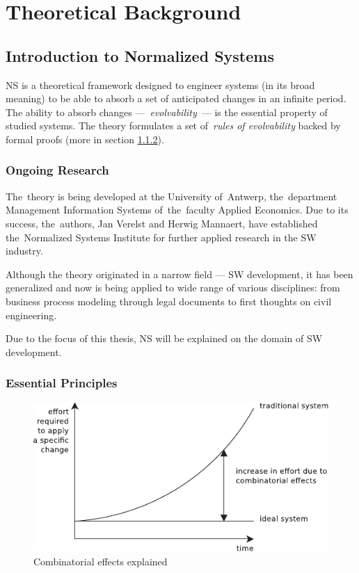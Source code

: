 \documentclass[thesis=M,english,hidelinks]{FITthesis}[2012/10/20]
\begin{document}
% 
% 
\chapter{Theoretical Background}
\label{sec:theoretical_background}

% 
% 
\section{Introduction to Normalized Systems}
\acrfull{NS} is a theoretical framework designed to engineer systems (in its broad meaning) to be able to absorb a set of anticipated changes in an infinite period. The ability to absorb changes ---~\textit{evolvability}~--- is the essential property of studied systems. The theory formulates a set of~\textit{rules of evolvability} backed by formal proofs (more in section \ref{sec:evolvability_rules}).

\subsection{Ongoing Research}
The~theory is being developed at the University of~Antwerp, the~department Management Information Systems of~the~faculty Applied Economics. Due to its success, the~authors, Jan Verelst and Herwig Mannaert, have established the~Normalized Systems Institute for further applied research in the \acrshort{SW} industry.

Although the theory originated in a narrow field --- \acrlong{SW} development, it has been generalized and now is being applied to wide range of various disciplines: from business process modeling through legal documents to first thoughts on civil engineering.~\cite{ns-towards-evolvable}

Due to the focus of this thesis, \acrlong{NS} will be explained on the domain of \acrlong{SW} development.

\subsection{Essential Principles}
\label{sec:evolvability_rules}

\begin{figure}[t]
  \centering
    \includegraphics{images/Combinatorial_effects_explained.pdf}
   	\caption{Combinatorial effects explained~\cite{ns-recreating}}
    \label{fig:combinatorial_effects}
\end{figure}
\end{document}
